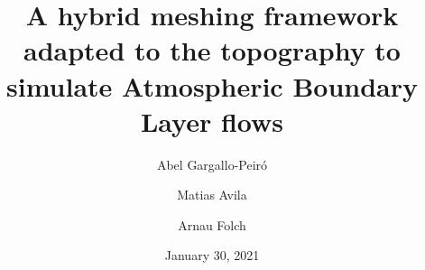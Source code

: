 \documentclass[1p]{elsarticle}
\begin{document}
\begin{frontmatter}

\title{A hybrid meshing framework adapted to the topography to simulate Atmospheric Boundary Layer flows}

\date{January 30, 2021}

\author[bsc]{Abel Gargallo-Peir\'o}

\author[bsc]{Matias Avila}

\author[bsc]{Arnau Folch}

\address[bsc]{Computer Applications in Science and Engineering, Barcelona Supercomputing Center, 08034 Barcelona, Spain.}


%
%
%


\end{frontmatter}
\end{document}
